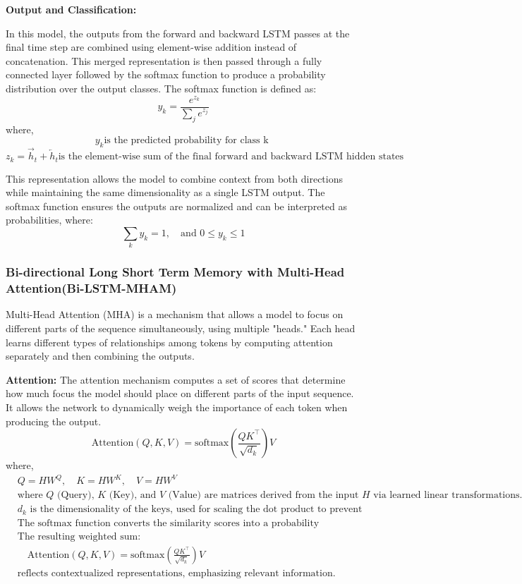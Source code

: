\documentclass{article}
\begin{document}
\textbf{Output and Classification:}

In this model, the outputs from the forward and backward LSTM passes at the final time step are combined using element-wise addition instead of concatenation. This merged representation is then passed through a fully connected layer followed by the softmax function to produce a probability distribution over the output classes.
The softmax function is defined as:
\[
y_k = \frac{e^{z_k}}{\sum_j e^{z_j}}
\]
where, \[y_k \text{is the predicted probability for class k } \]
\[z_k = \overrightarrow{h}_{t} +  \overleftarrow{h}_{t}  \text{is the element-wise sum of the final forward and backward LSTM hidden states for class k } \]

This representation allows the model to combine context from both directions while maintaining the same dimensionality as a single LSTM output. The softmax function ensures the outputs are normalized and can be interpreted as probabilities, where:
\[
\sum_k y_k = 1, \quad \text{and } 0 \leq y_k \leq 1
\]

\subsubsection{Bi-directional Long Short Term Memory with Multi-Head Attention(Bi-LSTM-MHAM)}

Multi-Head Attention (MHA) is a mechanism that allows a model to focus on different parts of the sequence simultaneously, using multiple "heads." Each head learns different types of relationships among tokens by computing attention separately and then combining the outputs.

\textbf{Attention:}
The attention mechanism computes a set of scores that determine how much focus the model should place on different parts of the input sequence. It allows the network to dynamically weigh the importance of each token when producing the output.
\[
\text{Attention}(Q, K, V) = \text{softmax}\left( \frac{QK^\top}{\sqrt{d_k}} \right) V
\]
where,
\[
\begin{aligned}
&Q = H W^Q, \quad K = H W^K, \quad V = H W^V \\
&\text{where } Q \text{ (Query), } K \text{ (Key), and } V \text{ (Value) are matrices derived from the input } H \text{ via learned linear transformations.} \\
&d_k \text{ is the dimensionality of the keys, used for scaling the dot product to prevent large gradients.} \\
&\text{The softmax function converts the similarity scores into a probability distribution over the sequence.} \\
&\text{The resulting weighted sum:} \\
&\quad \text{Attention}(Q, K, V) = \text{softmax} \left( \frac{Q K^\top}{\sqrt{d_k}} \right) V \\
&\text{reflects contextualized representations, emphasizing relevant information.}
\end{aligned}
\]
\end{document}
